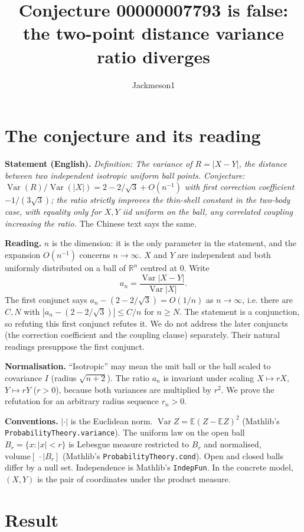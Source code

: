 \documentclass[11pt]{article}
\title{Conjecture 00000007793 is false:\\ the two-point distance variance ratio diverges}
\author{Jackmeson1}
\date{}
\newcommand{\E}{\mathbb{E}}
\newcommand{\Var}{\operatorname{Var}}
\newcommand{\R}{\mathbb{R}}
\begin{document}
\maketitle

\section{The conjecture and its reading}

\textbf{Statement (English).} \emph{Definition: The variance of $R = |X-Y|$, the distance between two
independent isotropic uniform ball points. Conjecture: $\Var(R)/\Var(|X|) = 2 - 2/\sqrt 3 + O(n^{-1})$
with first correction coefficient $-1/(3\sqrt 3)$; the ratio strictly improves the thin-shell constant in
the two-body case, with equality only for $X, Y$ iid uniform on the ball, any correlated coupling
increasing the ratio.} The Chinese text says the same.

\textbf{Reading.} $n$ is the dimension: it is the only parameter in the statement, and the expansion
$O(n^{-1})$ concerns $n \to \infty$. $X$ and $Y$ are independent and both uniformly distributed on a ball of
$\R^n$ centred at $0$. Write
\[ a_n = \frac{\Var |X-Y|}{\Var |X|}. \]
The first conjunct says $a_n - (2 - 2/\sqrt3) = O(1/n)$ as $n \to \infty$, i.e. there are $C, N$ with
$|a_n - (2-2/\sqrt 3)| \le C/n$ for $n \ge N$. The statement is a conjunction, so refuting this first
conjunct refutes it. We do not address the later conjuncts (the correction coefficient and the coupling
clause) separately. Their natural readings presuppose the first conjunct.

\textbf{Normalisation.} ``Isotropic'' may mean the unit ball or the ball scaled to covariance $I$
(radius $\sqrt{n+2}$). The ratio $a_n$ is invariant under scaling $X \mapsto rX$, $Y \mapsto rY$
($r>0$), because both variances are multiplied by $r^2$. We prove the refutation for an arbitrary radius
sequence $r_n > 0$.

\textbf{Conventions.} $|\cdot|$ is the Euclidean norm. $\Var Z = \E(Z - \E Z)^2$ (Mathlib's
\texttt{ProbabilityTheory.variance}). The uniform law on the open ball $B_r = \{x : |x| < r\}$ is
Lebesgue measure restricted to $B_r$ and normalised, $\mathrm{volume}[\,\cdot \mid B_r]$
(Mathlib's \texttt{ProbabilityTheory.cond}). Open and closed balls differ by a null set.
Independence is Mathlib's \texttt{IndepFun}. In the concrete model, $(X,Y)$ is the pair of
coordinates under the product measure.

\section{Result}
\end{document}
